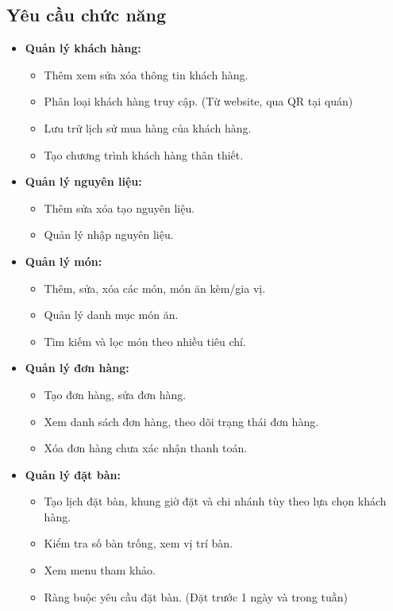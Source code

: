 \documentclass[a4paper]{article}
\begin{document}
\subsection{Yêu cầu chức năng}
\begin{itemize}
\item \textbf{Quản lý khách hàng:}
  \begin{itemize}
    \item Thêm xem sửa xóa thông tin khách hàng.
    \item Phân loại khách hàng truy cập. (Từ website, qua QR tại quán)
    \item Lưu trữ lịch sử mua hàng của khách hàng.
    \item Tạo chương trình khách hàng thân thiết.
  \end{itemize}

\item \textbf{Quản lý nguyên liệu:}
  \begin{itemize}
    \item Thêm sửa xóa tạo nguyên liệu.
    \item Quản lý nhập nguyên liệu.
  \end{itemize}

\item \textbf{Quản lý món:} 
  \begin{itemize}
    \item Thêm, sửa, xóa các món, món ăn kèm/gia vị.
    \item Quản lý danh mục món ăn.
    \item Tìm kiếm và lọc món theo nhiều tiêu chí.
  \end{itemize}

\item \textbf{Quản lý đơn hàng:}
  \begin{itemize}
    \item Tạo đơn hàng, sửa đơn hàng.
    \item Xem danh sách đơn hàng, theo dõi trạng thái đơn hàng.
    \item Xóa đơn hàng chưa xác nhận thanh toán.
  \end{itemize}

\item \textbf{Quản lý đặt bàn:}
  \begin{itemize}
    \item Tạo lịch đặt bàn, khung giờ đặt và chi nhánh tùy theo lựa chọn khách hàng.
    \item Kiểm tra số bàn trống, xem vị trí bàn.
    \item Xem menu tham khảo.
    \item Ràng buộc yêu cầu đặt bàn. (Đặt trước 1 ngày và trong tuần)
  \end{itemize}


\end{itemize}
\end{document}
